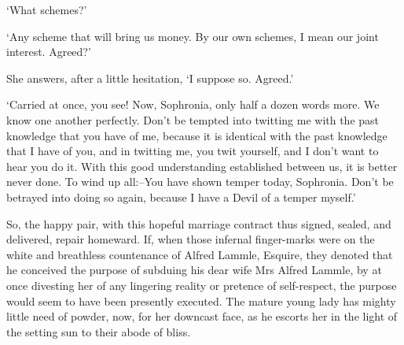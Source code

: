 ‘What schemes?’

‘Any scheme that will bring us money. By our own schemes, I mean our
joint interest. Agreed?’

She answers, after a little hesitation, ‘I suppose so. Agreed.’

‘Carried at once, you see! Now, Sophronia, only half a dozen words more.
We know one another perfectly. Don’t be tempted into twitting me with
the past knowledge that you have of me, because it is identical with
the past knowledge that I have of you, and in twitting me, you
twit yourself, and I don’t want to hear you do it. With this good
understanding established between us, it is better never done. To wind
up all:--You have shown temper today, Sophronia. Don’t be betrayed into
doing so again, because I have a Devil of a temper myself.’

So, the happy pair, with this hopeful marriage contract thus signed,
sealed, and delivered, repair homeward. If, when those infernal
finger-marks were on the white and breathless countenance of Alfred
Lammle, Esquire, they denoted that he conceived the purpose of subduing
his dear wife Mrs Alfred Lammle, by at once divesting her of any
lingering reality or pretence of self-respect, the purpose would seem
to have been presently executed. The mature young lady has mighty little
need of powder, now, for her downcast face, as he escorts her in the
light of the setting sun to their abode of bliss.



